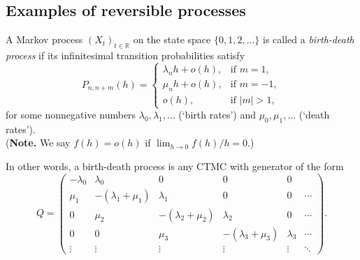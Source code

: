 \documentclass[a4paper,10pt,english]{article}
\begin{document}
\subsection{Examples of reversible processes}
\begin{shaded*}
\begin{exmp}
\label{exmp:birthdeath}
\begin{defn}
A Markov process $(X_t)_{t \in \mathbb{R}}$ on the state space $\{0, 1, 2, \ldots\}$ is called a {\em birth-death process} if its infinitesimal transition probabilities satisfy
\[ P_{n,n+m}(h) = \left\{
   \begin{array}{ll} %
      \lambda_n h + o(h), & \text{if } m = 1, \\
      \mu_n h + o(h), & \text{if } m = -1, \\
      o(h), & \text{if } |m| > 1, 
   \end{array}\right.
\]
for some nonnegative numbers $\lambda_0, \lambda_1, \ldots$ (`birth rates') and $\mu_0, \mu_1, \ldots$ (`death rates'). \\
({\bf Note.} We say $f(h) = o(h)$ if $\lim_{h \to 0} f(h)/h = 0$.)
\end{defn}
In other words, a birth-death process is any CTMC with generator of the form 
\[ 
   Q = \left( \begin{array}{cccccc} %
      -\lambda_0 & \lambda_0 & 0 & 0 & 0\\
      \mu_1 & -(\lambda_1 + \mu_1) & \lambda_1 & 0 & 0 & \cdots\\
      0 & \mu_2 & -(\lambda_2 + \mu_2) & \lambda_2 & 0 & \cdots\\
      0 & 0 & \mu_3 & -(\lambda_3 + \mu_3) & \lambda_3 & \cdots \\
      \vdots & \vdots & \vdots & \vdots & \vdots  & \ddots
   \end{array} \right).
\]
\end{exmp}
\end{shaded*}
\end{document}
